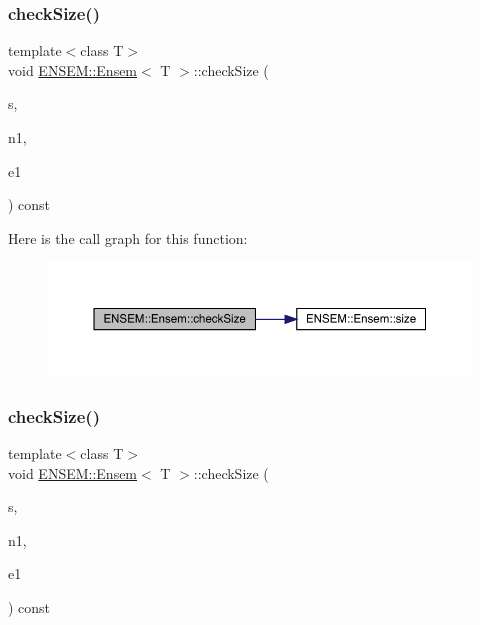 \subsubsection{\texorpdfstring{checkSize()}{checkSize()}\hspace{0.1cm}{\footnotesize\ttfamily [5/6]}}
{\footnotesize\ttfamily template$<$class T$>$ \\
void \mbox{\hyperlink{classENSEM_1_1Ensem}{E\+N\+S\+E\+M\+::\+Ensem}}$<$ T $>$\+::check\+Size (\begin{DoxyParamCaption}\item[{const char $\ast$}]{s,  }\item[{int}]{n1,  }\item[{\mbox{\hyperlink{namespaceENSEM_a2dc2c4a26884f343471e52f23479ddbe}{Ensem\+Type\+\_\+t}}}]{e1 }\end{DoxyParamCaption}) const\hspace{0.3cm}{\ttfamily [inline]}}

Here is the call graph for this function\+:
\nopagebreak
\begin{figure}[H]
\begin{center}
\leavevmode
\includegraphics[width=350pt]{d7/d3e/classENSEM_1_1Ensem_a4c06fadea7b637572de2347739b78004_cgraph}
\end{center}
\end{figure}
\mbox{\label{classENSEM_1_1Ensem_a4c06fadea7b637572de2347739b78004}} 
\subsubsection{\texorpdfstring{checkSize()}{checkSize()}\hspace{0.1cm}{\footnotesize\ttfamily [6/6]}}
{\footnotesize\ttfamily template$<$class T$>$ \\
void \mbox{\hyperlink{classENSEM_1_1Ensem}{E\+N\+S\+E\+M\+::\+Ensem}}$<$ T $>$\+::check\+Size (\begin{DoxyParamCaption}\item[{const char $\ast$}]{s,  }\item[{int}]{n1,  }\item[{\mbox{\hyperlink{namespaceENSEM_a2dc2c4a26884f343471e52f23479ddbe}{Ensem\+Type\+\_\+t}}}]{e1 }\end{DoxyParamCaption}) const\hspace{0.3cm}{\ttfamily [inline]}}

